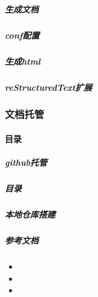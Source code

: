 \documentclass[a4paper,10pt,english]{sphinxmanual}
\begin{document}
\subparagraph{生成文档}
\label{\detokenize{sphinx/1-generate/5-build::doc}}\label{\detokenize{sphinx/1-generate/5-build:id1}}

\subparagraph{conf配置}
\label{\detokenize{sphinx/1-generate/5-build:conf}}

\subparagraph{生成html}
\label{\detokenize{sphinx/1-generate/5-build:html}}

\subparagraph{reStructuredText扩展}
\label{\detokenize{sphinx/1-generate/6-markup:restructuredtext}}\label{\detokenize{sphinx/1-generate/6-markup::doc}}

\subsubsection{文档托管}
\label{\detokenize{sphinx/2-collocation/index::doc}}\label{\detokenize{sphinx/2-collocation/index:id1}}

\paragraph{目录}
\label{\detokenize{sphinx/2-collocation/index:id2}}

\subparagraph{github托管}
\label{\detokenize{sphinx/2-collocation/1-github/index::doc}}\label{\detokenize{sphinx/2-collocation/1-github/index:github}}

\subparagraph{目录}
\label{\detokenize{sphinx/2-collocation/1-github/index:id1}}

\subparagraph{本地仓库搭建}
\label{\detokenize{sphinx/2-collocation/1-github/1-InitLocal::doc}}\label{\detokenize{sphinx/2-collocation/1-github/1-InitLocal:id1}}

\subparagraph{参考文档}
\label{\detokenize{sphinx/2-collocation/1-github/1-InitLocal:id2}}\begin{itemize}
\item {} 

\item {} 

\item {} 

\end{itemize}
\end{document}
